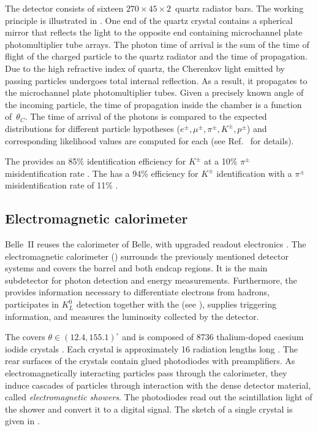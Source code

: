 The \TOP detector \cite{Fast:2017pff} consists of sixteen $270 \times 45 \times 2$~\cm quartz radiator bars.
The working principle is illustrated in .
One end of the quartz crystal contains a spherical mirror that reflects the light to the opposite end containing microchannel plate photomultiplier tube arrays.
The photon time of arrival is the sum of the time of flight of
the charged particle to the quartz radiator and the time of propagation.
Due to the high refractive index of quartz, the Cherenkov light emitted by passing particles undergoes total internal reflection.
As a result, it propagates to the microchannel plate photomultiplier tubes. 
Given a precisely known angle of the incoming particle, the time of propagation inside the chamber is a function of~$\theta_C$.
The time of arrival of the photons is compared to the expected distributions for different particle hypotheses ($e^{\pm},\mu^{\pm},\pi^{\pm},K^{\pm},p^{\pm}$) and corresponding likelihood values are computed for each (see Ref.~\cite{Yonenaga:2020eby} for details).

The \TOP provides an 85\% identification efficiency for $K^{\pm}$ at a 10\% $\pi^{\pm}$ misidentification rate \cite{Kojima:2022qcl}.
The \ARICH has a 94\% efficiency for $K^{\pm}$ identification with a $\pi^{\pm}$ misidentification rate of 11\% \cite{Yonenaga:2020eby}.

\subsection{Electromagnetic calorimeter}\label{sec:ecl}

Belle~II reuses the calorimeter of Belle, with upgraded readout electronics \cite{Belle-II:2010dht}.
The electromagnetic calorimeter (\ECL) surrounds the previously mentioned detector systems and covers the barrel and both endcap regions.
It is the main subdetector for photon detection and energy measurements.
Furthermore, the \ECL provides information necessary to differentiate electrons from hadrons, participates in $K_L^0$ detection together with the \KLM (see ),
supplies triggering information, and measures the luminosity collected by the detector.

The \ECL covers $\theta\in(12.4,155.1)^{\circ}$ and is composed of 8736 thalium-doped caesium iodide crystals \cite{Miyabayashi:2020xzp}.
Each crystal is approximately 16 radiation lengths long \cite{Aulchenko:2015nvy}.
The rear surfaces of the crystals contain glued photodiodes with preamplifiers.
As electromagnetically interacting particles pass through the calorimeter, they induce cascades of particles through interaction with the dense detector material, called \textit{electromagnetic showers}.
The photodiodes read out the scintillation light of the shower and convert it to a digital signal.
The sketch of a single \ECL crystal is given in .


